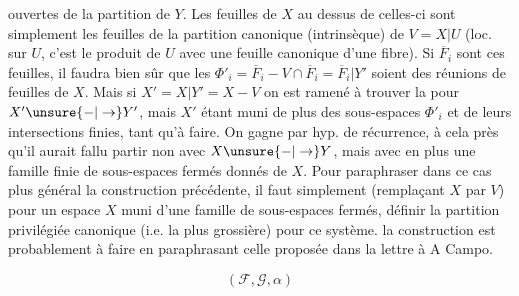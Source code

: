 ouvertes de la partition  de $Y$. Les feuilles de $X$ au dessus de celles-ci sont simplement les feuilles de la partition  canonique (intrinsèque) de $V=X|U$ (loc. sur $U$, c'est le produit de $U$ avec une feuille canonique d'une fibre). Si $\overline F_i$ sont ces feuilles, il faudra bien sûr que les $\Phi'_i=\overline F_i-V\cap\overline F_i=\overline F_i|Y'$ soient des réunions de feuilles de $X$.
Mais si $X'=X|Y'=X-V$ on est ramené à trouver la  pour $X'\unsure{-|\to}Y'$, mais $X'$ étant muni de plus des sous-espaces $\Phi'_i$ et de leurs intersections finies, tant qu'à faire. On gagne par hyp. de récurrence, à cela près qu'il aurait fallu partir non avec $X\unsure{-|\to}Y$, mais avec en plus une famille finie de sous-espaces fermés donnés de $X$. Pour paraphraser dans ce cas plus général la construction précédente, il faut simplement (remplaçant $X$ par $V$) pour un espace $X$ muni d'une famille  de sous-espaces fermés, définir la  partition privilégiée canonique (i.e. la plus grossière) pour ce système.  la construction est probablement à faire en paraphrasant celle proposée dans la  lettre à A Campo.

\[(\mathcal F,\mathcal G,\alpha)\]


